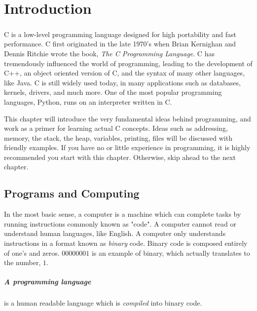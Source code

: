 
\chapter{Introduction}

\paragraph{   } C is a low-level programming language designed for high portability and fast performance. C first originated in the late 1970's when Brian Kernighan and Dennis Ritchie wrote the book, \textit{The C Programming Language}. C has tremendously influenced the world of programming, leading to the development of C++, an object oriented version of C, and the syntax of many other languages, like Java. C is still widely used today, in many applications such as databases, kernels, drivers, and much more. One of the most popular programming languages, Python, runs on an interpreter written in C.

\par This chapter will introduce the very fundamental ideas behind programming, and work as a primer for learning actual C concepts. Ideas such as addressing, memory, the stack, the heap, variables, printing, files will be discussed with friendly examples. If you have no or little experience in programming, it is highly recommended you start with this chapter. Otherwise, skip ahead to the next chapter.

\section{Programs and Computing}

\par In the most basic sense, a computer is a machine which can complete tasks by running instructions commonly known as "code". A computer cannot read or understand human languages, like English. A computer only understands instructions in a format known as \textit{binary} code. Binary code is composed entirely of one's and zeros. $00000001$ is an example of binary, which actually translates to the number, $1$. 
\paragraph{ A programming language} is a human readable language which is \textit{compiled} into binary code.